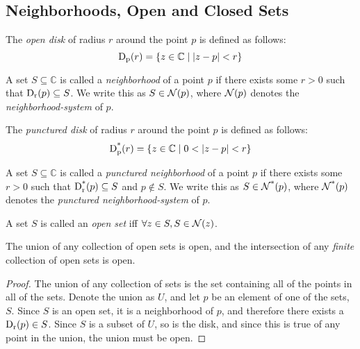 \documentclass{refbook}
\begin{document}
\subsection{Neighborhoods, Open and Closed Sets}
\begin{definition}
The \emph{open disk} of radius $r$ around the point $p$ is defined as follows:
\begin{equation*}\disk{r}{p} = \{z \in \mathbb{C} \mid \modulus{z-p} < r\}\end{equation*}
\end{definition}
\begin{definition}
A set $S \subseteq \mathbb{C}$ is called a \emph{neighborhood} of a point $p$ if there exists some $r > 0$ such that $\disk{p}{r} \subseteq S$.
We write this as $S \in \nbhd{p}$, where $\nbhd{p}$ denotes the \emph{neighborhood-system} of $p$.
\end{definition}
\begin{definition}
The \emph{punctured disk} of radius $r$ around the point $p$ is defined as follows:
\begin{equation*}\pdisk{r}{p} = \{z \in \mathbb{C} \mid 0<\modulus{z-p} < r\}\end{equation*}
\end{definition}
\begin{definition}
A set $S \subseteq \mathbb{C}$ is called a \emph{punctured neighborhood} of a point $p$ if there exists some $r > 0$ such that $\pdisk{p}{r} \subseteq S$ and $p \notin S$.
We write this as $S \in \pnbhd{p}$, where $\pnbhd{p}$ denotes the \emph{punctured neighborhood-system} of $p$.
\end{definition}
\begin{definition}
A set $S$ is called an \emph{open set} iff $\forall z \in S, S \in \nbhd{z}$.
\end{definition}
\begin{theorem}
The union of any collection of open sets is open, and the intersection of any \emph{finite} collection of open sets is open.
\end{theorem}
\begin{proof}
The union of any collection of sets is the set containing all of the points in all of the sets. Denote the union as $U$, and let $p$ be an element of one of the sets, $S$. Since $S$ is an open set, it is a neighborhood of $p$, and therefore there exists a $\disk{p}{r} \in S$.
Since $S$ is a subset of $U$, so is the disk, and since this is true of any point in the union, the union must be open. 
\end{proof}
\end{document}
